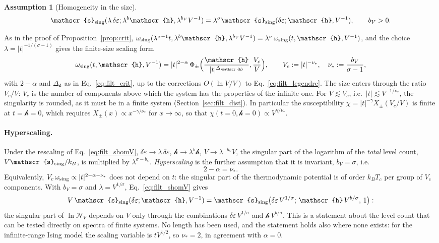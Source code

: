 \documentclass[10pt,a4paper]{article}
\theoremstyle{plain}
\newtheorem{assumption}{Assumption}
\newcommand{\cN}{\mathcal{N}}   %
\newcommand{\hfield}{\mathscr{h}}  %
\newcommand{\lds}{\mathscr{s}}  %
\begin{document}
\begin{assumption}[Homogeneity in the size]\label{ass:V}
\begin{equation}\label{eq:filt_shomV}
  \lds_{\rm sing}(\lambda\,\delta\varepsilon;\lambda^{b}\hfield,\lambda^{b_V}V^{-1})
  =\lambda^{\sigma}\lds_{\rm sing}(\delta\varepsilon;\hfield,V^{-1}) ,\qquad b_V>0 .
\end{equation}
\end{assumption}
As in the proof of Proposition~\ref{prop:crit},
$\omega_{\rm sing}(\lambda^{\sigma-1}t,\lambda^{b}\hfield,\lambda^{b_V}V^{-1})
=\lambda^{\sigma}\,\omega_{\rm sing}(t,\hfield,V^{-1})$, and the choice
$\lambda=|t|^{-1/(\sigma-1)}$ gives the finite-size scaling form
\begin{equation}\label{eq:filt_fss}
  \omega_{\rm sing}(t,\hfield,V^{-1})=|t|^{2-\alpha}\,
  \Phi_\pm\Big(\frac{\hfield}{|t|^{\Delta_\hfield}},\frac{V_c}{V}\Big) ,
  \qquad V_c:=|t|^{-\nu_*} ,\quad \nu_*:=\frac{b_V}{\sigma-1} ,
\end{equation}
with $2-\alpha$ and $\Delta_\hfield$ as in Eq.~\eqref{eq:filt_crit}, up to
the corrections $O(\ln V/V)$ to Eq.~\eqref{eq:filt_legendre}. The size
enters through the ratio $V_c/V$: $V_c$ is the number of components above
which the system has the properties of the infinite one. For
$V\lesssim V_c$, i.e.\ $|t|\lesssim V^{-1/\nu_*}$, the singularity is rounded,
as it must be in a finite system (Section~\ref{sec:filt_dist}). In
particular the susceptibility $\chi=|t|^{-\gamma}X_\pm(V_c/V)$ is finite at
$t=\hfield=0$, which requires $X_\pm(x)\propto x^{-\gamma/\nu_*}$ for
$x\to\infty$, so that $\chi(t=0,\hfield=0)\propto V^{\gamma/\nu_*}$.

\paragraph{Hyperscaling.} Under the rescaling of Eq.~\eqref{eq:filt_shomV},
$\delta\varepsilon\to\lambda\,\delta\varepsilon$, $\hfield\to\lambda^{b}\hfield$,
$V\to\lambda^{-b_V}V$, the singular part of the logarithm of the \emph{total}
level count, $V \lds_{\rm sing}/k_B$, is multiplied by $\lambda^{\sigma-b_V}$.
\emph{Hyperscaling} is the further assumption that it is invariant,
$b_V=\sigma$, i.e.
\begin{equation}\label{eq:filt_hyper}
  2-\alpha=\nu_* .
\end{equation}
Equivalently, $V_c\,\omega_{\rm sing}\propto|t|^{2-\alpha-\nu_*}$ does not
depend on $t$: the singular part of the thermodynamic potential is of order
$k_BT_c$ per group of $V_c$ components. With $b_V=\sigma$ and
$\lambda=V^{1/\sigma}$, Eq.~\eqref{eq:filt_shomV} gives
\[
  V\,\lds_{\rm sing}(\delta\varepsilon;\hfield,V^{-1})
  =\lds_{\rm sing}\big(\delta\varepsilon\,V^{1/\sigma};\,\hfield\,V^{b/\sigma},\,1\big) :
\]
the singular part of $\ln\cN_V$ depends on $V$ only through the combinations
$\delta\varepsilon\,V^{1/\sigma}$ and $\hfield\,V^{b/\sigma}$. This is a
statement about the level count that can be tested directly on spectra of
finite systems. No length has been used, and the statement holds also where
none exists: for the infinite-range Ising model the scaling variable is
$tV^{1/2}$, so $\nu_*=2$, in agreement with $\alpha=0$.
\end{document}
